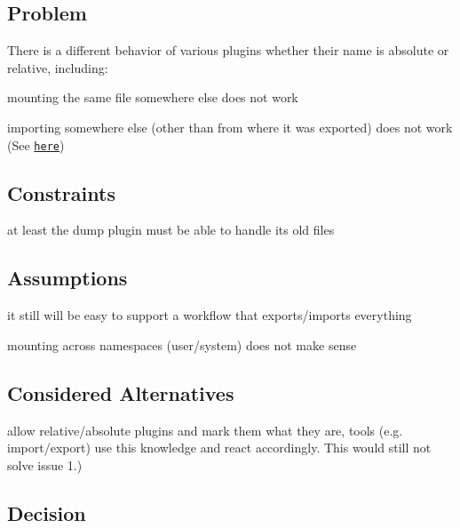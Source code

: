 \subsection*{Problem}

There is a different behavior of various plugins whether their name is absolute or relative, including\+:


\begin{DoxyEnumerate}
\item mounting the same file somewhere else does not work
\item importing somewhere else (other than from where it was exported) does not work (See \href{https://github.com/ElektraInitiative/libelektra/issues/51}{\tt here})
\end{DoxyEnumerate}

\subsection*{Constraints}


\begin{DoxyItemize}
\item at least the dump plugin must be able to handle its old files
\end{DoxyItemize}

\subsection*{Assumptions}


\begin{DoxyItemize}
\item it still will be easy to support a workflow that exports/imports everything
\item mounting across namespaces (user/system) does not make sense
\end{DoxyItemize}

\subsection*{Considered Alternatives}


\begin{DoxyItemize}
\item allow relative/absolute plugins and mark them what they are, tools (e.\+g. import/export) use this knowledge and react accordingly. This would still not solve issue 1.)
\end{DoxyItemize}

\subsection*{Decision}

